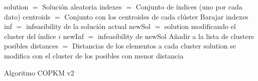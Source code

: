 \begin{algorithm}[H]
    \SetAlgoLined
        solution $=$ Solución aleatoria \;
        indexes $=$ Conjunto de índices (uno por cada dato) \;
        centroids $=$ Conjunto con los centroides de cada clúster \;
        Barajar indexes \;
         {
             {
                inf $=$ infeasibility de la solución actual \;
                 {
                    newSol $=$ solution modificando el cluster del índice $i$ \;
                    newInf $=$ infeasibility de newSol \;
                     {
                        Añadir a la lista de clusters posibles \;
                    }
                }
                distances $=$ Distancias de los elementos a cada cluster \;
                solution se modifica con el cluster de los posibles con menor distancia \; 
            }
        }
    \caption{Algoritmo COPKM v2}
\end{algorithm}